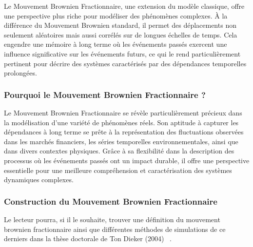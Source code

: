 Le Mouvement Brownien Fractionnaire, une extension du modèle classique, offre une perspective plus riche pour modéliser des phénomènes complexes. À la différence du Mouvement Brownien standard, il permet des déplacements non seulement aléatoires mais aussi corrélés sur de longues échelles de temps. Cela engendre une mémoire à long terme où les événements passés exercent une influence significative sur les événements futurs, ce qui le rend particulièrement pertinent pour décrire des systèmes caractérisés par des dépendances temporelles prolongées.

\subsubsection{Pourquoi le Mouvement Brownien Fractionnaire ?}

Le Mouvement Brownien Fractionnaire se révèle particulièrement précieux dans la modélisation d'une variété de phénomènes réels. Son aptitude à capturer les dépendances à long terme se prête à la représentation des fluctuations observées dans les marchés financiers, les séries temporelles environnementales, ainsi que dans divers contextes physiques. Grâce à sa flexibilité dans la description des processus où les événements passés ont un impact durable, il offre une perspective essentielle pour une meilleure compréhension et caractérisation des systèmes dynamiques complexes.

\subsubsection{Construction du Mouvement Brownien Fractionnaire}
Le lecteur pourra, si il le souhaite, trouver une définition du mouvement brownien fractionnaire ainsi que différentes méthodes de simulations de ce derniers dans la thèse doctorale de Ton Dieker (2004) ~\cite{dieker2004simulation}.
\citer{
Un mouvement Brownien fractionnaire normalisé $B_H = \{ B_H(t) : t\in \mathds R_+, H \in ]0,1[ \,\}$ est caractérisé de façon unique par :
$$
	\begin{array}{l}
		\textsf{les incréments de } B_H(t) \textsf{ sont stationnaires }
		\\
		B_H(0) = 0
		\\
		\forall t \in \mathds R_+ \quad \esperance{B_H(t)} = 0
		\\
		\forall t \in \mathds R_+ \quad \mathds E |B_H(t)|^2 = t^{2H} = \sigma^2_H(t)
		\\
		\forall t > 0 \quad B_H(t) \sim \mathcal N(0, \sigma^2_H(t) )
		\\
		C_{B_H}(u,v) = \esperance{B_H(u)B_H(v)} = \frac 1 2 \bigl[ u^{2H} + v^{2H} + |u-v|^{2H}  \bigr]
	\end{array}
$$

\begin{flushright}
	source : Diecker, 2004 ~\cite{dieker2004simulation}
\end{flushright}
}

